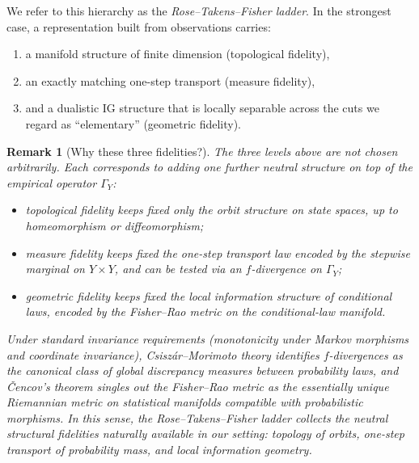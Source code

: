 \documentclass[11pt]{article}
\newtheorem{remark}{Remark}
\newcommand{\1}{\mathbf{1}}
\begin{document}
We refer to this hierarchy as the \emph{Rose--Takens--Fisher ladder}. In the strongest case, a representation built from observations carries:
\begin{enumerate}[leftmargin=1.8em]
  \item a manifold structure of finite dimension (topological fidelity),
  \item an exactly matching one-step transport (measure fidelity),
  \item and a dualistic IG structure that is locally separable across the cuts we regard as ``elementary''
        (geometric fidelity).
\end{enumerate}

\begin{remark}[Why these three fidelities?]
The three levels above are not chosen arbitrarily. Each corresponds to adding one further neutral structure on top of the empirical operator $\Gamma_Y$:
\begin{itemize}[leftmargin=1.5em]
  \item \emph{topological fidelity} keeps fixed only the orbit structure on state spaces, up to
  homeomorphism or diffeomorphism;
  \item \emph{measure fidelity} keeps fixed the one-step transport law encoded by the stepwise marginal
  on $Y\times Y$, and can be tested via an $f$-divergence on $\Gamma_Y$;
  \item \emph{geometric fidelity} keeps fixed the local information structure of conditional laws,
  encoded by the Fisher--Rao metric on the conditional-law manifold.
\end{itemize}
Under standard invariance requirements (monotonicity under Markov morphisms and coordinate invariance), Csiszár--Morimoto theory identifies $f$-divergences as the canonical class of global discrepancy measures between probability laws, and Čencov's theorem singles out the Fisher--Rao metric as the essentially unique Riemannian metric on statistical manifolds compatible with probabilistic morphisms. In this sense, the Rose--Takens--Fisher ladder collects the neutral structural fidelities naturally available in our setting: topology of orbits, one-step transport of probability mass, and local information geometry.
\end{remark}
\end{document}

